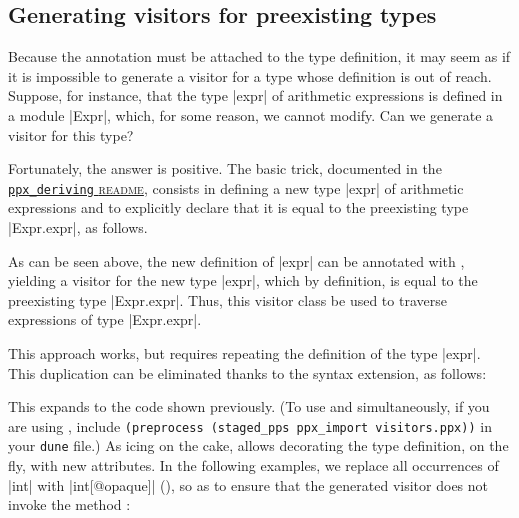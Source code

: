\documentclass[11pt,a4paper,twoside]{article}
\begin{document}
\subsection{Generating visitors for preexisting types}
\label{sec:import}

Because the \derivingvisitors annotation must be attached to the type
definition, it may seem as if it is impossible to generate a visitor for a
type whose definition is out of reach. Suppose, for instance, that the type
\oc|expr| of arithmetic expressions is defined in a module \oc|Expr|, which,
for some reason, we cannot modify. Can we generate a visitor for this type?

Fortunately, the answer is positive. The basic trick, documented in the
\href{https://github.com/whitequark/ppx_deriving/#working-with-existing-types}
{\texttt{ppx\_deriving} \textsc{readme}},
consists in defining a new type \oc|expr| of arithmetic expressions and to
explicitly declare that it is equal to the preexisting type \oc|Expr.expr|,
as follows.


As can be seen above, the new definition of \oc|expr| can be annotated with
\derivingvisitors, yielding a visitor for the new type \oc|expr|, which by
definition, is equal to the preexisting type \oc|Expr.expr|. Thus, this
visitor class be used to traverse expressions of type \oc|Expr.expr|.

This approach works, but requires repeating the definition of the type \oc|expr|.
This duplication can be eliminated thanks to the \ppximport syntax extension,
as follows:


This expands to the code shown previously.
(To use \ppximport and \visitors simultaneously,
if you are using \dune,
include
\verb+(preprocess (staged_pps ppx_import visitors.ppx))+
in your \texttt{dune} file.)
%
As icing on
the cake, \ppximport allows decorating the type definition, on the fly, with
new attributes. In the following examples, we replace all occurrences of
\oc|int| with \oc|int[@opaque]| (), so as to ensure that the
generated visitor does not invoke the method :


\end{document}
